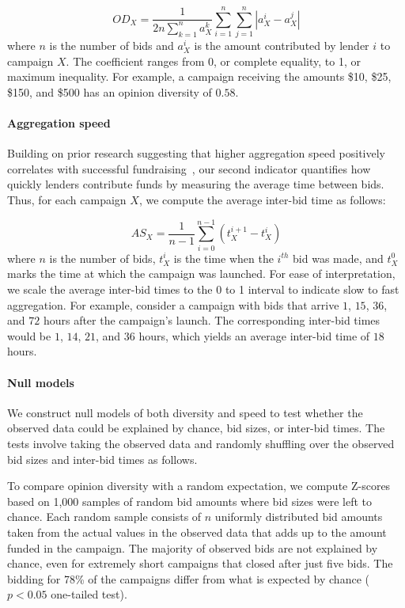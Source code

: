 \documentclass[sigconf]{acmart}
\begin{document}
\begin{equation}
    OD_{X}=\frac{1}{2n\sum_{k=1}^{n} a_{X}^{k}} \sum^{n}_{i=1} \sum_{j=1}^{n}|a_{X}^{i}-a_{X}^{j} |
    \label{eq:opinion_diversity}
\end{equation}
where $n$ is the number of bids and $a_{X}^{i}$ is the amount contributed by lender $i$ to campaign $X$. The coefficient ranges from 0, or complete equality, to 1, or maximum inequality. For example, a campaign receiving the amounts \$10, \$25, \$150, and \$500 has an opinion diversity of $0.58$.

\paragraph{Aggregation speed} Building on prior research suggesting that higher aggregation speed positively correlates with successful fundraising~\cite{dambanemuya2021multi,solomon2015don,Ceyhan2011}, our second indicator quantifies how quickly lenders contribute funds by measuring the average time between bids. Thus, for each campaign $X$, we compute the average inter-bid time as follows: 

\begin{equation}
    AS_{X}= \frac{1}{n-1} \sum_{i=0}^{n-1}(t_{X}^{i+1}-t_{X}^{i} )
    \label{eq:momentum}
\end{equation}
where $n$ is the number of bids, $t_{X}^{i}$ is the time when the $i^{th}$ bid was made, and $t_{X}^{0}$ marks the time at which the campaign was launched. For ease of interpretation, we scale the average inter-bid times to the 0 to 1 interval to indicate slow to fast aggregation. For example, consider a campaign with bids that arrive $1$, $15$, $36$, and $72$ hours after the campaign's launch. The corresponding inter-bid times would be $1$, $14$, $21$, and $36$ hours, which yields an average inter-bid time of $18$ hours.

\paragraph{Null models} We construct null models of both diversity and speed to test whether the observed data could be explained by chance, bid sizes, or inter-bid times. The tests involve taking the observed data and randomly shuffling over the observed bid sizes and inter-bid times as follows.

To compare opinion diversity with a random expectation, we compute Z-scores based on 1,000 samples of random bid amounts where bid sizes were left to chance. Each random sample consists of $n$ uniformly distributed bid amounts taken from the actual values in the observed data that adds up to the amount funded in the campaign. The majority of observed bids are not explained by chance, even for extremely short campaigns that closed after just five bids. The bidding for 78\% of the campaigns differ from what is expected by chance ($p < 0.05$ one-tailed test). 
\end{document}
